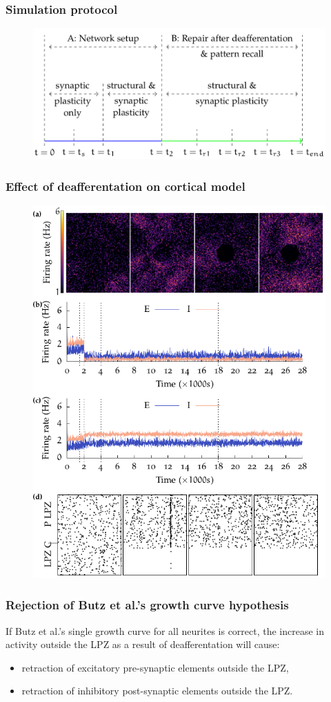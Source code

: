 \begin{frame}[c]
  \frametitle{Simulation protocol}
  \begin{figure}[h]
    \centering
    \includegraphics[width=0.8\linewidth]{99_images/recall-protocol}
  \end{figure}
\end{frame}
\begin{frame}[c]
  \frametitle{Effect of deafferentation on cortical model}
  \begin{figure}[h]
    \centering
    \includegraphics[width=0.5\linewidth]{99_images/deaff-only}
  \end{figure}
\end{frame}
\begin{frame}[c]
  \frametitle{Rejection of Butz et al.'s growth curve hypothesis}
  If Butz et al.'s single growth curve for all neurites is correct, the increase in activity outside the LPZ  as a result of deafferentation will cause:
  \begin{itemize}
    \item retraction of excitatory pre-synaptic elements outside the LPZ,
    \item retraction of inhibitory post-synaptic elements outside the LPZ\@.
  \end{itemize}
\end{frame}
